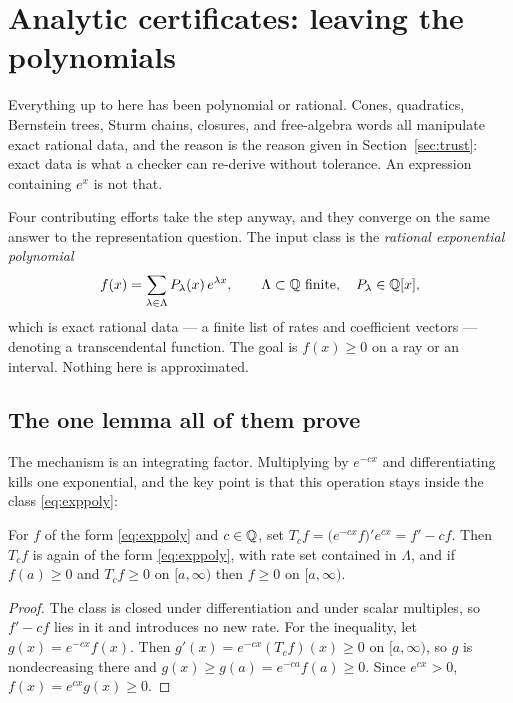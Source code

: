\section{Analytic certificates: leaving the polynomials}
\label{sec:analytic}

Everything up to here has been polynomial or rational. Cones, quadratics,
Bernstein trees, Sturm chains, closures, and free-algebra words all manipulate
exact rational data, and the reason is the reason given in
Section~\ref{sec:trust}: exact data is what a checker can re-derive without
tolerance. An expression containing $e^x$ is not that.

Four contributing efforts take the step anyway, and they converge on the same
answer to the representation question. The input class is the \emph{rational
exponential polynomial}
\begin{equation}\label{eq:exppoly}
 f(x)=\sum_{\lambda\in\Lambda}P_\lambda(x)\,e^{\lambda x},
 \qquad \Lambda\subset\mathbb{Q}\ \text{finite},\quad P_\lambda\in\mathbb{Q}[x],
\end{equation}
which is exact rational data --- a finite list of rates and coefficient vectors
--- denoting a transcendental function. The goal is $f(x)\ge0$ on a ray or an
interval. Nothing here is approximated.

\subsection{The one lemma all of them prove}

The mechanism is an integrating factor. Multiplying by $e^{-cx}$ and
differentiating kills one exponential, and the key point is that this operation
stays inside the class \eqref{eq:exppoly}:

\begin{lemma}\label{lem:factorstep}
For $f$ of the form \eqref{eq:exppoly} and $c\in\mathbb{Q}$, set
$T_cf=\bigl(e^{-cx}f\bigr)'e^{cx}=f'-cf$. Then $T_cf$ is again of the form
\eqref{eq:exppoly}, with rate set contained in $\Lambda$, and if $f(a)\ge0$
and $T_cf\ge0$ on $[a,\infty)$ then $f\ge0$ on $[a,\infty)$.
\end{lemma}
\begin{proof}
The class is closed under differentiation and under scalar multiples, so
$f'-cf$ lies in it and introduces no new rate. For the inequality, let
$g(x)=e^{-cx}f(x)$. Then $g'(x)=e^{-cx}(T_cf)(x)\ge0$ on $[a,\infty)$, so $g$
is nondecreasing there and $g(x)\ge g(a)=e^{-ca}f(a)\ge0$. Since $e^{cx}>0$,
$f(x)=e^{cx}g(x)\ge0$.
\end{proof}

